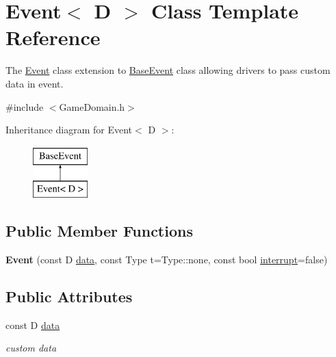 \hypertarget{classEvent}{}\section{Event$<$ D $>$ Class Template Reference}
\label{classEvent}


The \hyperlink{classEvent}{Event} class extension to \hyperlink{classBaseEvent}{Base\+Event} class allowing drivers to pass custom data in event.  




{\ttfamily \#include $<$Game\+Domain.\+h$>$}

Inheritance diagram for Event$<$ D $>$\+:\begin{figure}[H]
\begin{center}
\leavevmode
\includegraphics[height=2.000000cm]{classEvent}
\end{center}
\end{figure}
\subsection*{Public Member Functions}
\begin{DoxyCompactItemize}
\item 
\hypertarget{classEvent_a9f4c099332063f31a73277fb3dc74e30}{}{\bfseries Event} (const D \hyperlink{classEvent_a1e5208ad8d92b27baa16087db4cbe921}{data}, const Type t=Type\+::none, const bool \hyperlink{classBaseEvent_a57cb919c14ba312f0a6c5e5bfdc52135}{interrupt}=false)\label{classEvent_a9f4c099332063f31a73277fb3dc74e30}

\end{DoxyCompactItemize}
\subsection*{Public Attributes}
\begin{DoxyCompactItemize}
\item 
\hypertarget{classEvent_a1e5208ad8d92b27baa16087db4cbe921}{}const D \hyperlink{classEvent_a1e5208ad8d92b27baa16087db4cbe921}{data}\label{classEvent_a1e5208ad8d92b27baa16087db4cbe921}

\begin{DoxyCompactList}\small\item\em custom data \end{DoxyCompactList}\end{DoxyCompactItemize}
